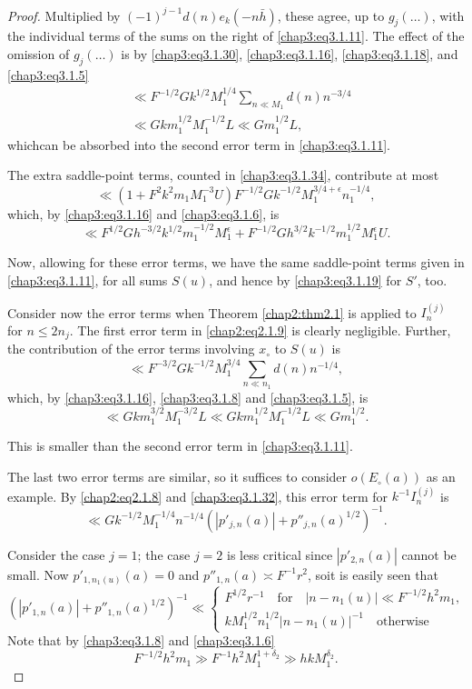 \begin{proof}
Multiplied by $(-1)^{j-1}d(n)e_k(-n\bar{h})$, these agree, up to
$g_j(\ldots)$, with the individual terms of the sums on the right of
\eqref{chap3:eq3.1.11}. The effect of the omission of $g_j(\ldots)$ is
by \eqref{chap3:eq3.1.30}, \eqref{chap3:eq3.1.16},
\eqref{chap3:eq3.1.18}, and \eqref{chap3:eq3.1.5}
\begin{align*}
&\ll F^{-1/2}Gk^{1/2}M_1^{1/4}\sum\limits_{n\ll M_1}d(n)n^{-3/4}\\
&\ll Gkm_1^{1/2}M_1^{-1/2}L\ll Gm_1^{1/2}L,
\end{align*}
which\pageoriginale can be absorbed into the second error term in
\eqref{chap3:eq3.1.11}. 

The extra saddle-point terms, counted in \eqref{chap3:eq3.1.34},
contribute at most
$$
\ll
\left(1+F^2k^2m_1M_1^{-3}U\right)F^{-1/2}Gk^{-1/2}M_1^{3/4+\epsilon}n_1^{-1/4},
$$
which, by \eqref{chap3:eq3.1.16} and \eqref{chap3:eq3.1.6}, is 
\begin{equation}\label{chap3:eq3.1.36}
\ll F^{1/2}Gh^{-3/2}k^{1/2}m_1^{-1/2}M_1^\epsilon+F^{-1/2}Gh^{3/2}k^{-1/2}
m_1^{1/2}M_1^\epsilon U.
\end{equation}

Now, allowing for these error terms, we have the same saddle-point
terms given in \eqref{chap3:eq3.1.11}, for all sums $S(u)$, and hence
by \eqref{chap3:eq3.1.19} for $S'$, too. 

Consider now the error terms when Theorem \ref{chap2:thm2.1} is
applied to $I_n^{(j)}$ for $n\leq 2n_j$. The first error term in
\eqref{chap2:eq2.1.9} is clearly negligible. Further, the contribution
of the error terms involving $x_\circ$ to $S(u)$ is 
$$
\ll F^{-3/2}Gk^{-1/2}M_1^{3/4}\sum\limits_{n\ll n_1}d(n)n^{-1/4},
$$
which, by \eqref{chap3:eq3.1.16}, \eqref{chap3:eq3.1.8} and
\eqref{chap3:eq3.1.5}, is 
$$
\ll Gkm_1^{3/2}M_1^{-3/2}L\ll Gkm_1^{1/2}M_1^{-1/2}L\ll Gm_1^{1/2}.
$$

This is smaller than the second error term in \eqref{chap3:eq3.1.11}.

The last two error terms are similar, so it suffices to consider
$o(E_\circ(a))$ as an example. By \eqref{chap2:eq2.1.8} and
\eqref{chap3:eq3.1.32}, this error term for $k^{-1}I_n^{(j)}$ is 
$$
\ll Gk^{-1/2}M_1^{-1/4}n^{-1/4}\left(\left|p'_{j,n}(a)\right|+
p''_{j,n}(a)^{1/2}\right)^{-1}.
$$

Consider the case $j=1$; the case $j=2$ is less critical since
$|p'_{2,n}(a)|$ cannot be small. Now $p'_{1,n_1(u)}(a)=0$ and
$p''_{1,n}(a)\asymp F^{-1}r^2$, so\pageoriginale it is easily seen
that 
{\fontsize{10}{12}\selectfont
\begin{equation*}
\left(\left|p'_{1,n}(a)\right|+p''_{1,n}(a)^{1/2}\right)^{-1}\ll
\begin{cases}
F^{1/2}r^{-1}\quad\text{for}\quad\left|n-n_1(u)\right|\ll F^{-1/2}
h^2m_1,\\
kM_1^{1/2}n_1^{1/2}\left|n-n_1(u)\right|^{-1}\quad\text{otherwise}
\end{cases}
\end{equation*}}
Note that by \eqref{chap3:eq3.1.8} and \eqref{chap3:eq3.1.6}
$$
F^{-1/2}h^2m_1\gg F^{-1}h^2M_1^{1+\delta_2}\gg hkM_1^{\delta_2}.
$$


\end{proof}
